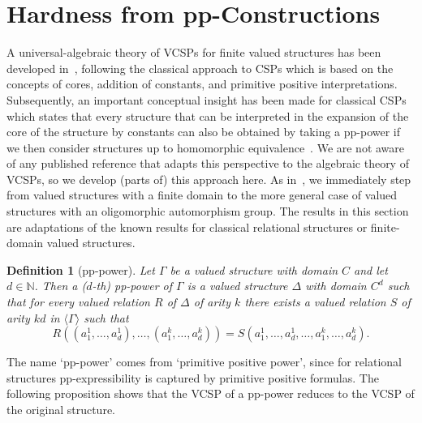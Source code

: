 \documentclass[nonacm]{acmart}
\newtheorem{definition}[theorem]{Definition}
\begin{document}
\section{Hardness from pp-Constructions}
\label{sect:gen-hard}
A universal-algebraic theory of VCSPs for finite valued structures has been developed in~\cite{KozikOchremiak15}, following the classical approach to CSPs which is based on the concepts of cores, addition of constants, and primitive positive interpretations. Subsequently, 
an important conceptual insight has been made for classical CSPs which states that every structure that can be interpreted in the expansion of the core of the structure by constants can also be obtained by taking a pp-power if we then consider structures up to homomorphic equivalence~\cite{wonderland}. 
We are not aware of any published reference that adapts this perspective to the algebraic theory of VCSPs, so we  develop (parts of) this approach here. As in~\cite{wonderland}, we immediately step from valued structures with a finite domain to the more general case of valued structures with an oligomorphic automorphism group. The results in this section are adaptations of the known results for classical relational structures or finite-domain valued structures.

\begin{definition}[pp-power]
Let $\Gamma$ be a valued structure with domain $C$ and let $d \in {\mathbb N}$. Then a ($d$-th) \emph{pp-power}
of $\Gamma$ is a valued structure $\Delta$ with domain 
$C^d$ such that for every valued relation $R$ of $\Delta$ of arity $k$ there exists a valued relation $S$ of arity $kd$ in $\langle \Gamma \rangle$ such that 
$$R((a^1_1,\dots,a^1_d),\dots,(a^k_1,\dots,a^k_d)) = S(a^1_1,\dots,a^1_d,\dots,a^k_1,\dots,a^k_d).$$ 
\end{definition}

The name `pp-power' comes from `primitive positive power', since for relational structures pp-expressibility is captured by primitive positive formulas. The following proposition shows that the VCSP of a pp-power reduces to the VCSP of the original structure.
\end{document}
